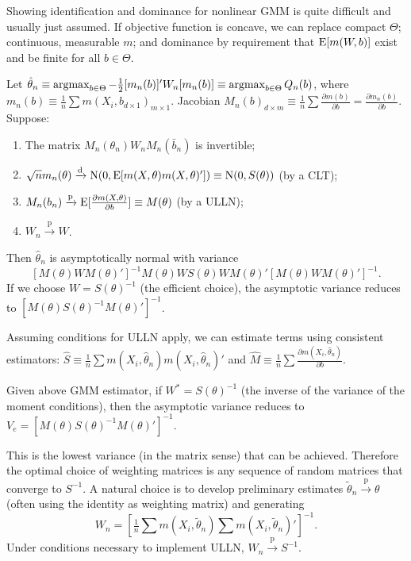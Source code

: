 \documentclass[8pt,letterpaper, landscape]{extarticle} %
\begin{document}
\begin{multicols}{3}
\begin{description}
Showing identification and dominance for nonlinear GMM is quite difficult and usually just assumed. If objective function is concave, we can replace compact $ \Theta $; continuous, measurable $ m $; and dominance by requirement that $ \operatorname{E} [m(W,b)] $ exist and be finite for all $ b \in \Theta $.

 Let $ \hat{\theta}_n \equiv \operatorname*{argmax}_{b \in \Theta} - \frac{1}{2} [m_n(b)]' W_n [m_n(b)] \equiv \operatorname*{argmax}_{b \in \Theta} Q_n(b) $, where $ m_n(b) \equiv  \tfrac{1}{n} \sum m(X_i, b_{d \times 1})_{m \times 1} $. Jacobian $ M_n(b)_{d \times m} \equiv \tfrac{1}{n} \sum \frac{\partial m(b)}{\partial b} = \frac{\partial m_n(b)}{\partial b} $. Suppose:
\begin{enumerate}
\item The matrix $ M_n(\theta_n) W_n M_n (\bar{b}_n) $ is invertible;
\item $ \sqrt{n} m_n (\theta) \xrightarrow{\text{d}} \operatorname{N} (0, \operatorname{E} [m(X, \theta) m(X, \theta)']) \equiv \operatorname{N} (0, S(\theta)) $ (by a CLT);
\item $ M_n (b_n) \xrightarrow{\text{p}} \operatorname{E} [ \frac{\partial m(X, \theta)}{\partial b}] \equiv M(\theta) $ (by a ULLN);
\item $ W_n \xrightarrow{\text{p}} W $.
\end{enumerate}
Then $ \hat{\theta}_n $ is asymptotically normal with variance
$$ [M(\theta) W M(\theta)']^{-1} M(\theta) W S(\theta) W M(\theta)' [M(\theta) W M(\theta)']^{-1}. $$
If we choose $ W = S(\theta)^{-1} $ (the efficient choice), the asymptotic variance reduces to $ [M(\theta) S(\theta)^{-1} M(\theta)']^{-1} $.

Assuming conditions for ULLN apply, we can estimate terms using consistent estimators: $ \widehat{S} \equiv \tfrac{1}{n} \sum m(X_i, \hat{\theta}_n) m(X_i, \hat{\theta}_n)' $ and $ \widehat{M} \equiv \tfrac{1}{n} \sum \frac{\partial m(X_i, \hat{\theta}_n)}{\partial b} $.

 Given above GMM estimator, if $ W^* = S(\theta)^{-1} $ (the inverse of the variance of the moment conditions), then the asymptotic variance reduces to $ V_e = [M(\theta) S(\theta)^{-1} M(\theta)']^{-1} $.

This is the lowest variance (in the matrix sense) that can be achieved. Therefore the optimal choice of weighting matrices is any sequence of random matrices that converge to $ S^{-1} $. A natural choice is to develop preliminary estimates $ \tilde{\theta}_n \xrightarrow{\text{p}} \theta $ (often using the identity as weighting matrix) and generating
$$ W_n = \left[ \tfrac{1}{n} \sum m(X_i, \tilde{\theta}_n) \sum m(X_i, \tilde{\theta}_n)' \right]^{-1}. $$
Under conditions necessary to implement ULLN, $ W_n \xrightarrow{\text{p}} S^{-1} $.


\end{description}
\end{multicols}
\end{document}
